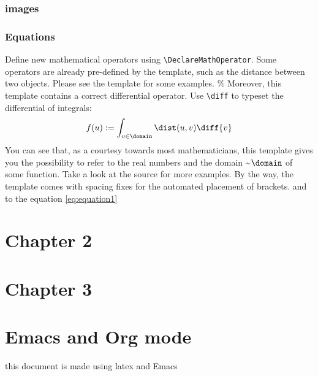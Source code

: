 \documentclass{tufte-org}
\numberwithin{equation}{chapter}
\numberwithin{listing}{chapter}
\begin{document}
\subsubsection{images}
\label{sec:orgcd41f70}
\subsubsection{Equations}
\label{sec:org4833222}
Define new mathematical operators using \verb|\DeclareMathOperator|.
Some operators are already pre-defined by the template, such as the
distance between two objects. Please see the template for some examples. 
\%
Moreover, this template contains a correct differential operator. Use \verb|\diff| to typeset the differential of integrals:
\begin{equation}\label{eq:equation1}
  f(u) := \int_{v \in \domain}\dist(u,v)\diff{v}
\end{equation}
You can see that, as a courtesy towards most mathematicians, this
template gives you the possibility to refer to the real numbers 
and the domain \textasciitilde{}\(\domain\) of some function. Take a look at the source for
more examples. By the way, the template comes with spacing fixes for the
automated placement of brackets.
and to the equation \eqref{eq:equation1}

\section[Configuration]{Chapter 2}
\label{sec:org5863e35}
\section[Conclusion]{Chapter 3}
\label{sec:orgc62cce3}
\appendix
\section{Emacs and Org mode}
\label{sec:orgde349be}
this document is made using \gls{latex} and Emacs

\backmatter
\begingroup
    \let\clearpage\relax
    \glsaddall
    \printglossary[type=\acronymtype]
    \newpage
    \printglossary
\endgroup
\printindex

\printbibliography
\end{document}
